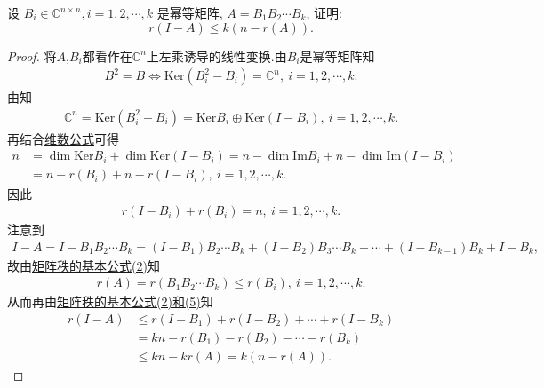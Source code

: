 \documentclass[../../main.tex]{subfiles}%
\begin{document}
\begin{example}
设 $B_i \in \mathbb{C}^{n \times n}, i = 1, 2, \cdots, k$ 是幂等矩阵, $A = B_1 B_2 \cdots B_k$, 证明:
$$
r(I - A) \leqslant k(n - r(A)).
$$
\end{example}
\begin{proof}

将$A$,$B_i$都看作在$\mathbb{C}^n$上左乘诱导的线性变换.由$B_i$是幂等矩阵知
\begin{align*}
B^2 = B \Longleftrightarrow \mathrm{Ker} (B_i^2 - B_i) = \mathbb{C}^n,\ i = 1,2,\cdots,k.
\end{align*}
由知
\begin{align*}
\mathbb{C}^n = \mathrm{Ker} (B_i^2 - B_i) = \mathrm{Ker} B_i \oplus \mathrm{Ker} (I - B_i),\ i = 1,2,\cdots,k.
\end{align*}
再结合\hyperref[theorem:值域和核空间维数之和等于原像空间维数]{维数公式}可得
\begin{align*}
n &= \dim \mathrm{Ker} B_i + \dim \mathrm{Ker} (I - B_i) = n - \dim \mathrm{Im} B_i + n - \dim \mathrm{Im} (I - B_i) \\
&= n - r(B_i) + n - r(I - B_i),\ i = 1,2,\cdots,k.
\end{align*}
因此
\begin{align*}
r(I - B_i) + r(B_i) = n,\ i = 1,2,\cdots,k. 
\end{align*}
注意到
\begin{align*}
I - A = I - B_1B_2\cdots B_k = (I - B_1)B_2\cdots B_k + (I - B_2)B_3\cdots B_k + \cdots + (I - B_{k-1})B_k + I - B_k,
\end{align*}
故由\hyperref[proposition:矩阵秩的基本公式]{矩阵秩的基本公式(2)}知
\begin{align*}
r(A) = r(B_1B_2\cdots B_k) \leqslant r(B_i),\ i = 1,2,\cdots,k.
\end{align*}
从而再由\hyperref[proposition:矩阵秩的基本公式]{矩阵秩的基本公式(2)和(5)}知
\begin{align*}
r(I - A) &\leqslant r(I - B_1) + r(I - B_2) + \cdots + r(I - B_k) \\
&= kn - r(B_1) - r(B_2) - \cdots - r(B_k) \\
&\leqslant kn - kr(A) = k(n - r(A)).
\end{align*}

\end{proof}
\end{document}
